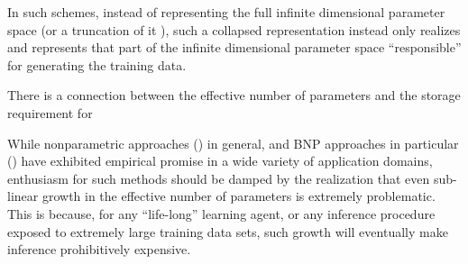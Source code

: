 {%


In such schemes, instead of representing the full infinite dimensional parameter space (or a truncation of it \cite{blei variational stuff}), such a collapsed representation instead only realizes and represents that part of the infinite dimensional parameter space ``responsible'' for generating the training data.     


There is a connection between the effective number of parameters and the storage requirement for 

While nonparametric approaches (\cite{lots of shit}) in general, and BNP approaches in particular (\cite{lots more shit}) have exhibited empirical promise in a wide variety of application domains, enthusiasm for such methods should be damped by the realization that even sub-linear growth in the effective number of parameters is extremely problematic.  This is because, for any ``life-long'' learning agent, or any inference procedure exposed to extremely large training data sets, such growth will eventually make inference prohibitively expensive.  

}
